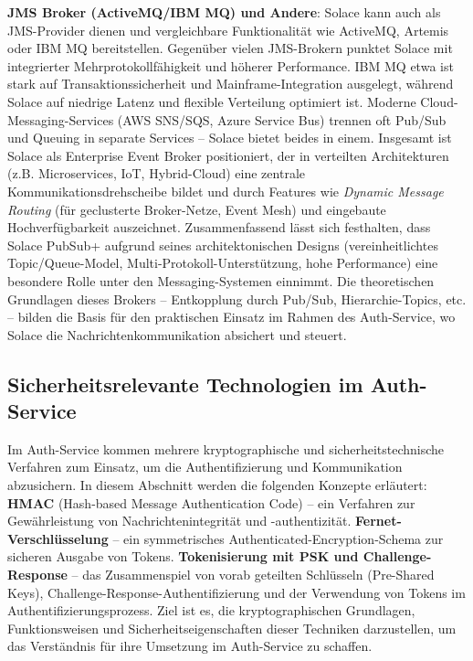 \textbf{JMS Broker (ActiveMQ/IBM MQ) und Andere}: Solace kann auch als JMS-Provider dienen und vergleichbare Funktionalität wie ActiveMQ, Artemis oder IBM MQ bereitstellen. Gegenüber vielen JMS-Brokern punktet Solace mit integrierter Mehrprotokollfähigkeit und höherer Performance. IBM MQ etwa ist stark auf Transaktionssicherheit und Mainframe-Integration ausgelegt, während Solace auf niedrige Latenz und flexible Verteilung optimiert ist. Moderne Cloud-Messaging-Services (AWS SNS/SQS, Azure Service Bus) trennen oft Pub/Sub und Queuing in separate Services – Solace bietet beides in einem. Insgesamt ist Solace als \glqq Enterprise Event Broker\grqq{} positioniert, der in verteilten Architekturen (z.B. Microservices, IoT, Hybrid-Cloud) eine zentrale Kommunikationsdrehscheibe bildet und durch Features wie \textit{Dynamic Message Routing} (für geclusterte Broker-Netze, Event Mesh) und eingebaute Hochverfügbarkeit auszeichnet.
Zusammenfassend lässt sich festhalten, dass Solace PubSub+ aufgrund seines architektonischen Designs (vereinheitlichtes Topic/Queue-Model, Multi-Protokoll-Unterstützung, hohe Performance) eine besondere Rolle unter den Messaging-Systemen einnimmt. Die theoretischen Grundlagen dieses Brokers – Entkopplung durch Pub/Sub, Hierarchie-Topics, etc. – bilden die Basis für den praktischen Einsatz im Rahmen des Auth-Service, wo Solace die Nachrichtenkommunikation absichert und steuert.


\subsection{Sicherheitsrelevante Technologien im Auth-Service}

Im Auth-Service kommen mehrere kryptographische und sicherheitstechnische Verfahren zum Einsatz, um die Authentifizierung und Kommunikation abzusichern. In diesem Abschnitt werden die folgenden Konzepte erläutert:
\textbf{HMAC} (Hash-based Message Authentication Code) – ein Verfahren zur Gewährleistung von Nachrichtenintegrität und -authentizität.
\textbf{Fernet-Verschlüsselung} – ein symmetrisches Authenticated-Encryption-Schema zur sicheren Ausgabe von Tokens.
\textbf{Tokenisierung mit PSK und Challenge-Response} – das Zusammenspiel von vorab geteilten Schlüsseln (Pre-Shared Keys), Challenge-Response-Authentifizierung und der Verwendung von Tokens im Authentifizierungsprozess.
Ziel ist es, die kryptographischen Grundlagen, Funktionsweisen und Sicherheitseigenschaften dieser Techniken darzustellen, um das Verständnis für ihre Umsetzung im Auth-Service zu schaffen.

